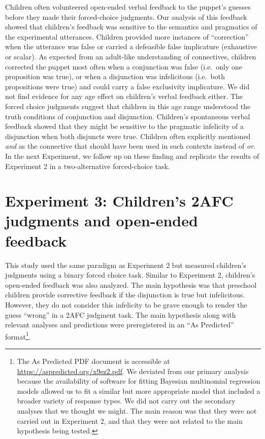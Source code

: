\documentclass[
  english,
  ,man,floatsintext]{apa6}
\begin{document}
Children often volunteered open-ended verbal feedback to the puppet's guesses before they made their forced-choice judgments. Our analysis of this feedback showed that children's feedback was sensitive to the semantics and pragmatics of the experimental utterances. Children provided more instances of \enquote{correction} when the utterance was false or carried a defeasible false implicature (exhaustive or scalar). As expected from an adult-like understanding of connectives, children corrected the puppet most often when a conjunction was false (i.e.~only one proposition was true), or when a disjunction was infelicitous (i.e.~both propositions were true) and could carry a false exclusivity implicature. We did not find evidence for any age effect on children's verbal feedback either. The forced choice judgments suggest that children in this age range understood the truth conditions of conjunction and disjunction. Children's spontaneous verbal feedback showed that they might be sensitive to the pragmatic infelicity of a disjunction when both disjuncts were true. Children often explicitly mentioned \emph{and} as the connective that should have been used in such contexts instead of \emph{or}. In the next Experiment, we follow up on these finding and replicate the results of Experiment 2 in a two-alternative forced-choice task.

\hypertarget{study3}{%
\section{Experiment 3: Children's 2AFC judgments and open-ended feedback}\label{study3}}

This study used the same paradigm as Experiment 2 but measured children's judgments using a binary forced choice task. Similar to Experiment 2, children's open-ended feedback was also analyzed. The main hypothesis was that preschool children provide corrective feedback if the disjunction is true but infelicitous. However, they do not consider this infelicity to be grave enough to render the guess \enquote{wrong} in a 2AFC judgment task. The main hypothesis along with relevant analyses and predictions were preregistered in an \enquote{As Predicted} format\footnote{The As Predicted PDF document is accessible at \url{https://aspredicted.org/x9ez2.pdf}. We deviated from our primary analysis because the availability of software for fitting Bayesian multinomial regression models allowed us to fit a similar but more appropriate model that included a broader variety of response types. We did not carry out the secondary analyses that we thought we might. The main reason was that they were not carried out in Experiment 2, and that they were not related to the main hypothesis being tested.}.
\end{document}
